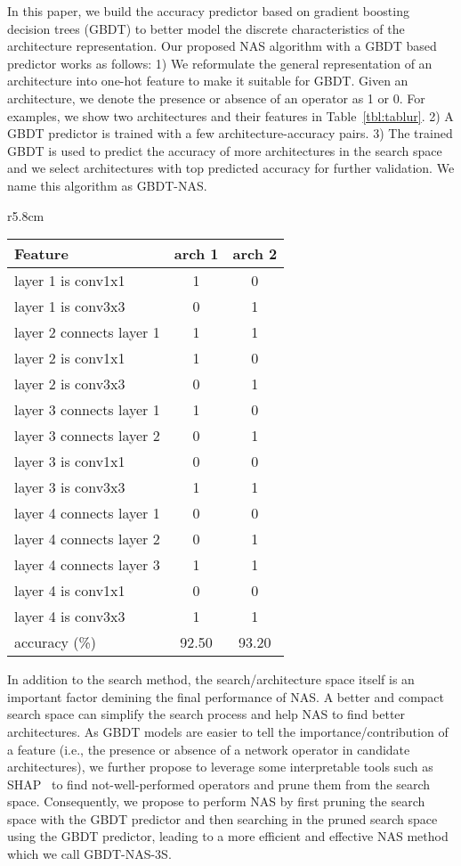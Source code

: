 \documentclass{article}
\begin{document}
In this paper, we build the accuracy predictor based on gradient boosting decision trees (GBDT) to better model the discrete characteristics of the architecture representation. Our proposed NAS algorithm with a GBDT based predictor works as follows: 1) We reformulate the general representation of an architecture into one-hot feature to make it suitable for GBDT. Given an architecture, we denote the presence or absence of an operator as 1 or 0. For examples, we show two architectures and their features in Table~\ref{tbl:tablur}. 2) A GBDT predictor is trained with a few architecture-accuracy pairs. 3) The trained GBDT is used to predict the accuracy of more architectures in the search space and we select architectures with top predicted accuracy for further validation. We name this algorithm as GBDT-NAS.
\begin{wraptable}{r}{5.8cm}
\small
\label{tbl:tablur}
\caption{Two examples of architectures with tabular data representation and the corresponding accuracy. `arch' stands for architecture.}
\centering
\begin{tabular}{l|c|c}
\toprule
Feature & arch 1 & arch 2\\
\midrule
layer 1 is conv1x1 & 1 & 0 \\
layer 1 is conv3x3 & 0 & 1 \\
layer 2 connects layer 1 & 1 & 1 \\
layer 2 is conv1x1 & 1 & 0 \\
layer 2 is conv3x3 & 0 & 1 \\
layer 3 connects layer 1 & 1 & 0 \\
layer 3 connects layer 2 & 0 & 1 \\
layer 3 is conv1x1 & 0 & 0 \\
layer 3 is conv3x3 & 1 & 1 \\
layer 4 connects layer 1 & 0 & 0 \\
layer 4 connects layer 2 & 0 & 1 \\
layer 4 connects layer 3 & 1 & 1 \\
layer 4 is conv1x1 & 0 & 0 \\
layer 4 is conv3x3 & 1 & 1 \\
\midrule
accuracy (\%) & 92.50 & 93.20 \\
\bottomrule
\end{tabular}
\end{wraptable}


In addition to the search method, the search/architecture space itself is an important factor demining the final performance of NAS. A better and compact search space can simplify the search process and help NAS to find better architectures. As GBDT models are easier to tell the importance/contribution of a feature (i.e., the presence or absence of a network operator in candidate architectures), we further propose to leverage some interpretable tools such as SHAP~\cite{unifiedshap} to find not-well-performed operators and prune them from the search space. Consequently, we propose to perform NAS by first pruning the search space with the GBDT predictor and then searching in the pruned search space using the GBDT predictor, leading to a more efficient and effective NAS method which we call GBDT-NAS-3S.
\end{document}
